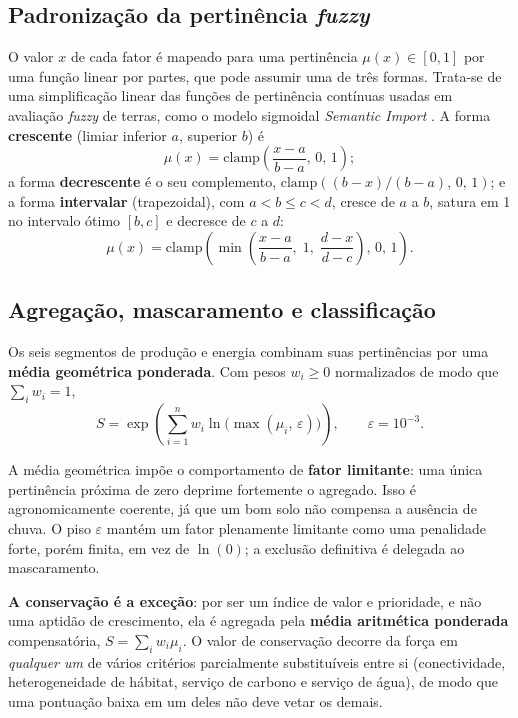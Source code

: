 \subsection{Padronização da pertinência \emph{fuzzy}}\label{sec:fuzzy-standard}

O valor $x$ de cada fator é mapeado para uma pertinência $\mu(x) \in [0,1]$ por uma função linear por
partes, que pode assumir uma de três formas. Trata-se de uma simplificação linear das funções de
pertinência contínuas usadas em avaliação \emph{fuzzy} de terras, como o modelo sigmoidal
\emph{Semantic Import} \citep[pp.~80--83]{yaghmaeian_mahabadi_land_2012}. A forma \textbf{crescente}
(limiar inferior $a$, superior $b$) é
\begin{equation*}
  \mu(x) = \mathrm{clamp}\!\left(\frac{x-a}{b-a},\, 0,\, 1\right);
\end{equation*}
a forma \textbf{decrescente} é o seu complemento, $\mathrm{clamp}((b-x)/(b-a),\, 0,\, 1)$; e a forma
\textbf{intervalar} (trapezoidal), com $a < b \le c < d$, cresce de $a$ a $b$, satura em 1 no
intervalo ótimo $[b,c]$ e decresce de $c$ a $d$:
\begin{equation*}
  \mu(x) = \mathrm{clamp}\!\left(\min\!\left(\frac{x-a}{b-a},\; 1,\; \frac{d-x}{d-c}\right),\, 0,\, 1\right).
\end{equation*}

\subsection{Agregação, mascaramento e classificação}\label{sec:aggregation}

Os seis segmentos de produção e energia combinam suas pertinências por uma \textbf{média geométrica
ponderada}. Com pesos $w_i \ge 0$ normalizados de modo que $\sum_i w_i = 1$,
\begin{equation*}
  S = \exp\!\left(\sum_{i=1}^{n} w_i \ln\!\big(\max(\mu_i,\,\varepsilon)\big)\right),
   \qquad \varepsilon = 10^{-3}.
\end{equation*}

A média geométrica impõe o comportamento de \textbf{fator limitante}: uma única pertinência próxima
de zero deprime fortemente o agregado. Isso é agronomicamente coerente, já que um bom solo não
compensa a ausência de chuva. O piso $\varepsilon$ mantém um fator plenamente limitante como uma
penalidade forte, porém finita, em vez de $\ln(0)$; a exclusão definitiva é delegada ao mascaramento.

\textbf{A conservação é a exceção}: por ser um índice de valor e prioridade, e não uma aptidão de
crescimento, ela é agregada pela \textbf{média aritmética ponderada} compensatória,
$S = \sum_i w_i \mu_i$. O valor de conservação decorre da força em \emph{qualquer um} de vários
critérios parcialmente substituíveis entre si (conectividade, heterogeneidade de hábitat, serviço
de carbono e serviço de água), de modo que uma pontuação baixa em um deles não deve vetar os demais.

